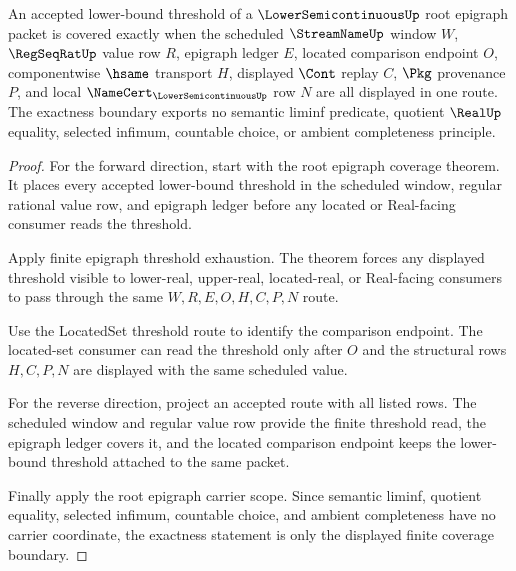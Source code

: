 \begin{theorem}
\label{thm:lowersemicontinuous-root-epigraph-coverage-exactness}
An accepted lower-bound threshold of a $\LowerSemicontinuousUp$ root epigraph packet is covered exactly when the scheduled $\StreamNameUp$ window $W$, $\RegSeqRatUp$ value row $R$, epigraph ledger $E$, located comparison endpoint $O$, componentwise $\hsame$ transport $H$, displayed $\Cont$ replay $C$, $\Pkg$ provenance $P$, and local $\NameCert_{\LowerSemicontinuousUp}$ row $N$ are all displayed in one route. The exactness boundary exports no semantic liminf predicate, quotient $\RealUp$ equality, selected infimum, countable choice, or ambient completeness principle.
\end{theorem}
\begin{proof}
For the forward direction, start with the root epigraph coverage theorem. It places every accepted lower-bound threshold in the scheduled window, regular rational value row, and epigraph ledger before any located or Real-facing consumer reads the threshold.

Apply finite epigraph threshold exhaustion. The theorem forces any displayed threshold visible to lower-real, upper-real, located-real, or Real-facing consumers to pass through the same $W,R,E,O,H,C,P,N$ route.

Use the LocatedSet threshold route to identify the comparison endpoint. The located-set consumer can read the threshold only after $O$ and the structural rows $H,C,P,N$ are displayed with the same scheduled value.

For the reverse direction, project an accepted route with all listed rows. The scheduled window and regular value row provide the finite threshold read, the epigraph ledger covers it, and the located comparison endpoint keeps the lower-bound threshold attached to the same packet.

Finally apply the root epigraph carrier scope. Since semantic liminf, quotient equality, selected infimum, countable choice, and ambient completeness have no carrier coordinate, the exactness statement is only the displayed finite coverage boundary.
\end{proof}


